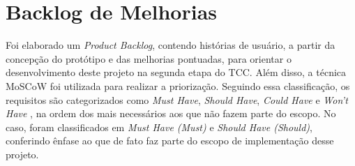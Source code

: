 \section{Backlog de Melhorias}
\label{sec:Backlog de Melhorias}
Foi elaborado um \textit{Product Backlog}, contendo histórias de usuário, a partir da concepção do protótipo e das melhorias pontuadas, para orientar o desenvolvimento deste projeto na segunda etapa do TCC. Além disso, a técnica MoSCoW foi utilizada para realizar a priorização. Seguindo essa classificação, 
os requisitos são categorizados como \textit{Must Have}, \textit{Should Have}, \textit{Could Have} e \textit{Won't Have} \cite{miranda2021}, na ordem dos mais necessários aos que não fazem parte do escopo. No caso, foram classificados em \textit{Must Have (Must)} e \textit{Should Have (Should)}, conferindo ênfase ao que de 
fato faz parte do escopo de implementação desse projeto.

\newpage

